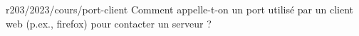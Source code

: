 \begin{question}{r203/2023/cours/port-client}
  Comment appelle-t-on un port utilisé par un client web (p.ex.,
  firefox) pour contacter un serveur ?
  \begin{reponses}
  \end{reponses}
\end{question}
